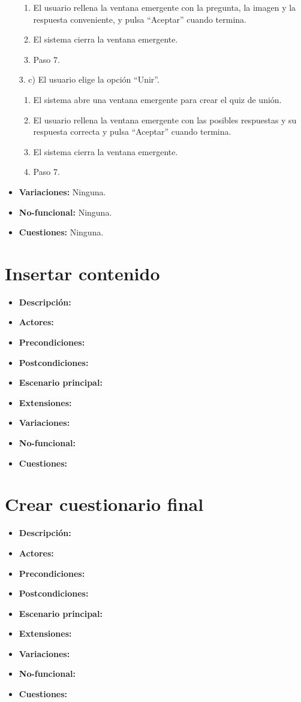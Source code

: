 \documentclass[12pt,letterpaper]{article}
\begin{document}
\begin{itemize}
\begin{enumerate}
		\item El usuario rellena la ventana emergente con la pregunta, la imagen y la respuesta conveniente, y pulsa ``Aceptar'' cuando termina.
		\item El sistema cierra la ventana emergente.
		\item Paso 7.
	\end{enumerate}
	3. c) El usuario elige la opción ``Unir''.
	\begin{enumerate}
		\item El sistema abre una ventana emergente para crear el quiz de unión.
		\item El usuario rellena la ventana emergente con las posibles respuestas y su respuesta correcta y pulsa ``Aceptar'' cuando termina.
		\item El sistema cierra la ventana emergente.
		\item Paso 7.
	\end{enumerate}
	\item \textbf{Variaciones:} Ninguna.
	\item \textbf{No-funcional:} Ninguna.
	\item \textbf{Cuestiones:} Ninguna.
\end{itemize}


\section{Insertar contenido}
\begin{itemize}
	\item \textbf{Descripción:}
	\item \textbf{Actores:}
	\item \textbf{Precondiciones:}
	\item \textbf{Postcondiciones:}
	\item \textbf{Escenario principal:}
	\item \textbf{Extensiones:}
	\item \textbf{Variaciones:}
	\item \textbf{No-funcional:}
	\item \textbf{Cuestiones:}
\end{itemize}

\section{Crear cuestionario final}
\begin{itemize}
	\item \textbf{Descripción:}
	\item \textbf{Actores:}
	\item \textbf{Precondiciones:}
	\item \textbf{Postcondiciones:}
	\item \textbf{Escenario principal:}
	\item \textbf{Extensiones:}
	\item \textbf{Variaciones:}
	\item \textbf{No-funcional:}
	\item \textbf{Cuestiones:}
\end{itemize}
\end{document}
